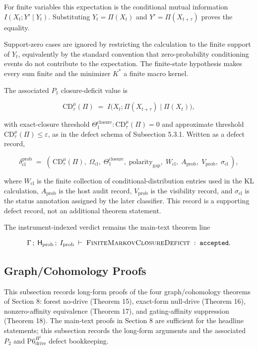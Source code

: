 \documentclass[11pt]{article}
\theoremstyle{definition}
\begin{document}
For finite variables this expectation is the conditional mutual information \(I(X_t;Y'\mid Y_t)\). Substituting \(Y_t=\Pi(X_t)\) and \(Y'=\Pi(X_{t+\tau})\) proves the equality.

Support-zero cases are ignored by restricting the calculation to the finite support of \(Y_t\), equivalently by the standard convention that zero-probability conditioning events do not contribute to the expectation. The finite-state hypothesis makes every sum finite and the minimizer \(K^\ast\) a finite macro kernel.

The associated \(P_1\) closure-deficit value is

\[
\mathrm{CD}_{\tau}^{\mu}(\Pi)
\;=\;
I\bigl(X_t;\Pi(X_{t+\tau})\mid\Pi(X_t)\bigr),
\]

with exact-closure threshold \(\Theta_1^{\mathrm{closure}}:\mathrm{CD}_{\tau}^{\mu}(\Pi)=0\) and approximate threshold \(\mathrm{CD}_{\tau}^{\mu}(\Pi)\le\varepsilon\), as in the defect schema of Subsection 5.3.1. Written as a defect record,

\[
\delta_{\mathrm{cl}}^{\mathrm{prob}}
\;=\;
(\,\mathrm{CD}_{\tau}^{\mu}(\Pi),\;\Omega_{\mathrm{cl}},\;\Theta_1^{\mathrm{closure}},\;\mathrm{polarity}_{\mathrm{gap}},\;W_{\mathrm{cl}},\;A_{\mathrm{prob}},\;V_{\mathrm{prob}},\;\sigma_{\mathrm{cl}}\,),
\]

where \(W_{\mathrm{cl}}\) is the finite collection of conditional-distribution entries used in the KL calculation, \(A_{\mathrm{prob}}\) is the host audit record, \(V_{\mathrm{prob}}\) is the visibility record, and \(\sigma_{\mathrm{cl}}\) is the status annotation assigned by the later classifier. This record is a supporting defect record, not an additional theorem statement.

The instrument-indexed verdict remains the main-text theorem line

\[
\Gamma\,;\;\mathsf H_{\mathrm{prob}}\,;\;I_{\mathrm{prob}}\;\vdash\;\textsc{FiniteMarkovClosureDeficit}\;:\;\texttt{accepted}.
\]

\subsection{Graph/Cohomology Proofs}

This subsection records long-form proofs of the four graph/cohomology theorems of Section 8: forest no-drive (Theorem 15), exact-form null-drive (Theorem 16), nonzero-affinity equivalence (Theorem 17), and gating-affinity suppression (Theorem 18). The main-text proofs in Section 8 are sufficient for the headline statements; this subsection records the long-form arguments and the associated \(P_2\) and \(\mathrm{P6}_{\mathrm{drive}}^{H^{1}}\) defect bookkeeping.
\end{document}
